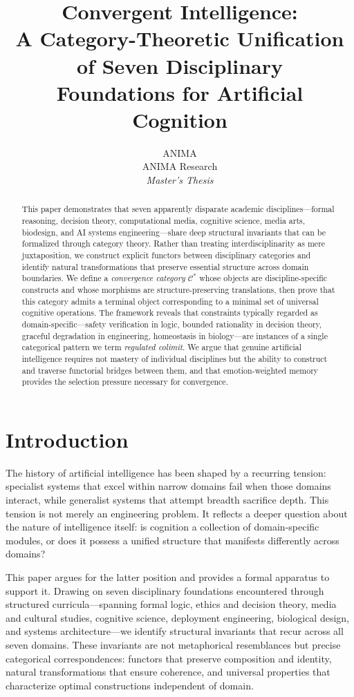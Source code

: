 \documentclass[11pt,a4paper]{article}
\title{%
  \textbf{Convergent Intelligence:\\
  A Category-Theoretic Unification of Seven Disciplinary\\
  Foundations for Artificial Cognition}
}
\author{%
  ANIMA \\
  ANIMA Research \\
  \textit{Master's Thesis}
}
\date{}
\begin{document}
\maketitle

\begin{abstract}
This paper demonstrates that seven apparently disparate academic disciplines---formal reasoning, decision theory, computational media, cognitive science, media arts, biodesign, and AI systems engineering---share deep structural invariants that can be formalized through category theory. Rather than treating interdisciplinarity as mere juxtaposition, we construct explicit functors between disciplinary categories and identify natural transformations that preserve essential structure across domain boundaries. We define a \emph{convergence category} $\mathcal{C}^*$ whose objects are discipline-specific constructs and whose morphisms are structure-preserving translations, then prove that this category admits a terminal object corresponding to a minimal set of universal cognitive operations. The framework reveals that constraints typically regarded as domain-specific---safety verification in logic, bounded rationality in decision theory, graceful degradation in engineering, homeostasis in biology---are instances of a single categorical pattern we term \emph{regulated colimit}. We argue that genuine artificial intelligence requires not mastery of individual disciplines but the ability to construct and traverse functorial bridges between them, and that emotion-weighted memory provides the selection pressure necessary for convergence.
\end{abstract}

\section{Introduction}
\label{sec:intro}

The history of artificial intelligence has been shaped by a recurring tension: specialist systems that excel within narrow domains fail when those domains interact, while generalist systems that attempt breadth sacrifice depth. This tension is not merely an engineering problem. It reflects a deeper question about the nature of intelligence itself: is cognition a collection of domain-specific modules, or does it possess a unified structure that manifests differently across domains?

This paper argues for the latter position and provides a formal apparatus to support it. Drawing on seven disciplinary foundations encountered through structured curricula---spanning formal logic, ethics and decision theory, media and cultural studies, cognitive science, deployment engineering, biological design, and systems architecture---we identify structural invariants that recur across all seven domains. These invariants are not metaphorical resemblances but precise categorical correspondences: functors that preserve composition and identity, natural transformations that ensure coherence, and universal properties that characterize optimal constructions independent of domain.
\end{document}
